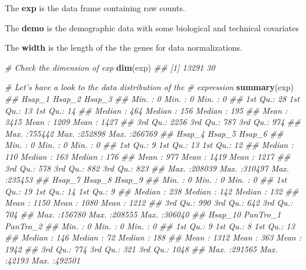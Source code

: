 \documentclass[]{book}
\newenvironment{Shaded}{\begin{snugshade}}{\end{snugshade}}
\newcommand{\CommentTok}[1]{\textcolor[rgb]{0.56,0.35,0.01}{\textit{#1}}}
\newcommand{\KeywordTok}[1]{\textcolor[rgb]{0.13,0.29,0.53}{\textbf{#1}}}
\newcommand{\NormalTok}[1]{#1}
\begin{document}
The \textbf{exp} is the data frame containing raw counts.

The \textbf{demo} is the demographic data with some biological and technical covariates

The \textbf{width} is the length of the the genes for data normalizations.

\begin{Shaded}
\begin{Highlighting}[]
\CommentTok{# Check the dimension of exp}
\KeywordTok{dim}\NormalTok{(exp)}
\CommentTok{## [1] 13291    30}

\CommentTok{# Let's have a look to the data distribution of the}
\CommentTok{# expression}
\KeywordTok{summary}\NormalTok{(exp)}
\CommentTok{##      Hsap_1           Hsap_2           Hsap_3      }
\CommentTok{##  Min.   :     0   Min.   :     0   Min.   :     0  }
\CommentTok{##  1st Qu.:    28   1st Qu.:    13   1st Qu.:    14  }
\CommentTok{##  Median :   464   Median :   156   Median :   195  }
\CommentTok{##  Mean   :  3415   Mean   :  1209   Mean   :  1427  }
\CommentTok{##  3rd Qu.:  2256   3rd Qu.:   787   3rd Qu.:   974  }
\CommentTok{##  Max.   :755442   Max.   :252898   Max.   :266769  }
\CommentTok{##      Hsap_4           Hsap_5           Hsap_6      }
\CommentTok{##  Min.   :     0   Min.   :     0   Min.   :     0  }
\CommentTok{##  1st Qu.:     9   1st Qu.:    13   1st Qu.:    12  }
\CommentTok{##  Median :   110   Median :   163   Median :   176  }
\CommentTok{##  Mean   :   977   Mean   :  1419   Mean   :  1217  }
\CommentTok{##  3rd Qu.:   578   3rd Qu.:   882   3rd Qu.:   823  }
\CommentTok{##  Max.   :208039   Max.   :310497   Max.   :235453  }
\CommentTok{##      Hsap_7           Hsap_8           Hsap_9      }
\CommentTok{##  Min.   :     0   Min.   :     0   Min.   :     0  }
\CommentTok{##  1st Qu.:    19   1st Qu.:    14   1st Qu.:     9  }
\CommentTok{##  Median :   238   Median :   142   Median :   132  }
\CommentTok{##  Mean   :  1150   Mean   :  1080   Mean   :  1212  }
\CommentTok{##  3rd Qu.:   990   3rd Qu.:   642   3rd Qu.:   704  }
\CommentTok{##  Max.   :156780   Max.   :208555   Max.   :306040  }
\CommentTok{##     Hsap_10          PanTro_1        PanTro_2     }
\CommentTok{##  Min.   :     0   Min.   :    0   Min.   :     0  }
\CommentTok{##  1st Qu.:     9   1st Qu.:    8   1st Qu.:    13  }
\CommentTok{##  Median :   146   Median :   72   Median :   188  }
\CommentTok{##  Mean   :  1312   Mean   :  363   Mean   :  1942  }
\CommentTok{##  3rd Qu.:   774   3rd Qu.:  321   3rd Qu.:  1048  }
\CommentTok{##  Max.   :291565   Max.   :42193   Max.   :492501  }

\end{Highlighting}
\end{Shaded}
\end{document}
